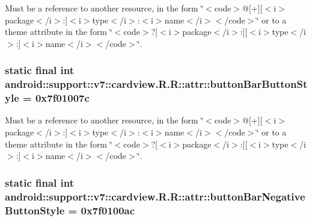 Must be a reference to another resource, in the form \char`\"{}$<$code$>$@\mbox{[}+\mbox{]}\mbox{[}$<$i$>$package$<$/i$>$:\mbox{]}$<$i$>$type$<$/i$>$:$<$i$>$name$<$/i$>$$<$/code$>$\char`\"{} or to a theme attribute in the form \char`\"{}$<$code$>$?\mbox{[}$<$i$>$package$<$/i$>$:\mbox{]}\mbox{[}$<$i$>$type$<$/i$>$:\mbox{]}$<$i$>$name$<$/i$>$$<$/code$>$\char`\"{}. \hypertarget{classandroid_1_1support_1_1v7_1_1cardview_1_1_r_1_1attr_85d1a99aeac54e1e2794ed2cef1c7739}{
\subsubsection[{buttonBarButtonStyle}]{\setlength{\rightskip}{0pt plus 5cm}static final int android::support::v7::cardview.R.R::attr::buttonBarButtonStyle = 0x7f01007c}}
\label{classandroid_1_1support_1_1v7_1_1cardview_1_1_r_1_1attr_85d1a99aeac54e1e2794ed2cef1c7739}


Must be a reference to another resource, in the form \char`\"{}$<$code$>$@\mbox{[}+\mbox{]}\mbox{[}$<$i$>$package$<$/i$>$:\mbox{]}$<$i$>$type$<$/i$>$:$<$i$>$name$<$/i$>$$<$/code$>$\char`\"{} or to a theme attribute in the form \char`\"{}$<$code$>$?\mbox{[}$<$i$>$package$<$/i$>$:\mbox{]}\mbox{[}$<$i$>$type$<$/i$>$:\mbox{]}$<$i$>$name$<$/i$>$$<$/code$>$\char`\"{}. \hypertarget{classandroid_1_1support_1_1v7_1_1cardview_1_1_r_1_1attr_3d2f0017264155f750256412f6ef528d}{
\subsubsection[{buttonBarNegativeButtonStyle}]{\setlength{\rightskip}{0pt plus 5cm}static final int android::support::v7::cardview.R.R::attr::buttonBarNegativeButtonStyle = 0x7f0100ac}}
\label{classandroid_1_1support_1_1v7_1_1cardview_1_1_r_1_1attr_3d2f0017264155f750256412f6ef528d}



